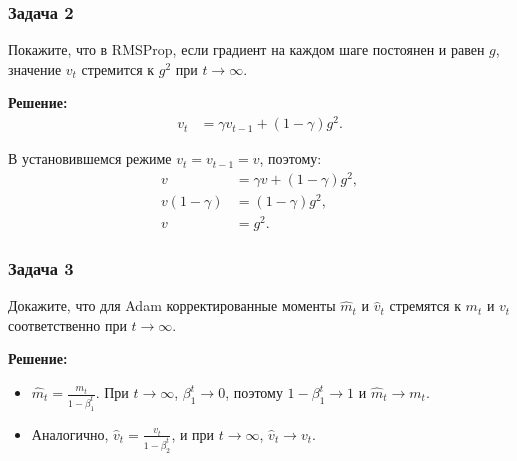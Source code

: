 \subsubsection*{Задача 2}
Покажите, что в RMSProp, если градиент на каждом шаге постоянен и равен $g$, значение $v_t$ стремится к $g^2$ при $t \to \infty$.

\textbf{Решение:}
\begin{align*}
    v_t &= \gamma v_{t-1} + (1 - \gamma) g^2.
\end{align*}

В установившемся режиме $v_t = v_{t-1} = v$, поэтому:
\begin{align*}
    v &= \gamma v + (1 - \gamma) g^2, \\
    v (1 - \gamma) &= (1 - \gamma) g^2, \\
    v &= g^2.
\end{align*}

\subsubsection*{Задача 3}
Докажите, что для Adam корректированные моменты $\hat{m}_t$ и $\hat{v}_t$ стремятся к $m_t$ и $v_t$ соответственно при $t \to \infty$.

\textbf{Решение:}
\begin{itemize}
    \item $\hat{m}_t = \frac{m_t}{1 - \beta_1^t}$. При $t \to \infty$, $\beta_1^t \to 0$, поэтому $1 - \beta_1^t \to 1$ и $\hat{m}_t \to m_t$.
    \item Аналогично, $\hat{v}_t = \frac{v_t}{1 - \beta_2^t}$, и при $t \to \infty$, $\hat{v}_t \to v_t$.
\end{itemize}
